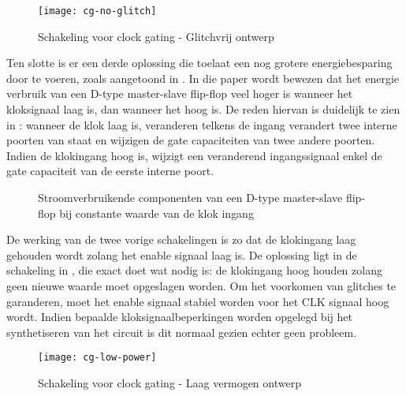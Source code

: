 \begin{figure}[h]
	\centering
		\texttt{[image: cg-no-glitch]}
		\caption{Schakeling voor clock gating - Glitchvrij ontwerp\label{figuur-implementatie-optimalisatie-cg-no-glitch}}
\end{figure}

Ten slotte is er een derde oplossing die toelaat een nog grotere energiebesparing door te voeren, zoals aangetoond in \cite{mueller}. In die paper wordt bewezen dat het energie verbruik van een D-type master-slave flip-flop veel hoger is wanneer het kloksignaal laag is, dan wanneer het hoog is. De reden hiervan is duidelijk te zien in : wanneer de klok laag is, veranderen telkens de ingang verandert twee interne poorten van staat en wijzigen de gate capaciteiten van twee andere poorten. Indien de klokingang hoog is, wijzigt een veranderend ingangssignaal enkel de gate capaciteit van de eerste interne poort.

\begin{figure}[h]
	\centering
		\caption[Stroomverbruikende componenten van een D-type master-slave flip-flop bij constante waarde van de klok ingang]{Stroomverbruikende componenten van een D-type master-slave flip-flop bij constante waarde van de klok ingang \protect\cite{mueller}\label{figuur-implementatie-optimalisatie-cg-power-dis}}
\end{figure}

De werking van de twee vorige schakelingen is zo dat de klokingang laag gehouden wordt zolang het enable signaal laag is. De oplossing ligt in de schakeling in , die exact doet wat nodig is: de klokingang hoog houden zolang geen nieuwe waarde moet opgeslagen worden. Om het voorkomen van glitches te garanderen, moet het enable signaal stabiel worden voor het CLK signaal hoog wordt. Indien bepaalde kloksignaalbeperkingen worden opgelegd bij het synthetiseren van het circuit is dit normaal gezien echter geen probleem.

\begin{figure}[h]
	\centering
		\texttt{[image: cg-low-power]}
		\caption{Schakeling voor clock gating - Laag vermogen ontwerp\label{figuur-implementatie-optimalisatie-cg-low-power}}
\end{figure}
